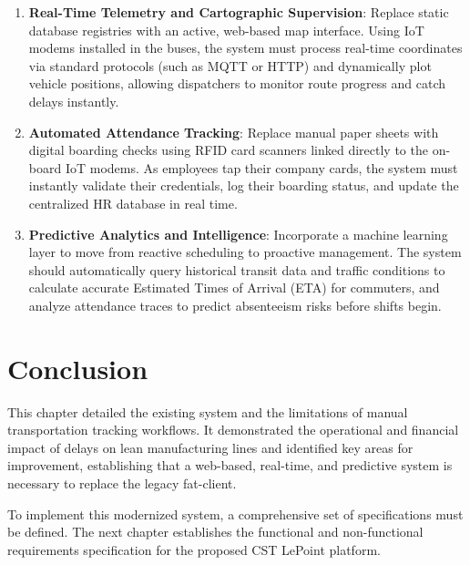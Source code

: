 \begin{enumerate}
  \item \textbf{Real-Time Telemetry and Cartographic Supervision}: Replace static database registries with an active, web-based map interface. Using IoT modems installed in the buses, the system must process real-time coordinates via standard protocols (such as MQTT or HTTP) and dynamically plot vehicle positions, allowing dispatchers to monitor route progress and catch delays instantly.
  \item \textbf{Automated Attendance Tracking}: Replace manual paper sheets with digital boarding checks using RFID card scanners linked directly to the on-board IoT modems. As employees tap their company cards, the system must instantly validate their credentials, log their boarding status, and update the centralized HR database in real time.
  \item \textbf{Predictive Analytics and Intelligence}: Incorporate a machine learning layer to move from reactive scheduling to proactive management. The system should automatically query historical transit data and traffic conditions to calculate accurate Estimated Times of Arrival (ETA) for commuters, and analyze attendance traces to predict absenteeism risks before shifts begin.
\end{enumerate}

\section{Conclusion}

This chapter detailed the existing system and the limitations of manual transportation tracking workflows. It demonstrated the operational and financial impact of delays on lean manufacturing lines and identified key areas for improvement, establishing that a web-based, real-time, and predictive system is necessary to replace the legacy fat-client.

To implement this modernized system, a comprehensive set of specifications must be defined. The next chapter establishes the functional and non-functional requirements specification for the proposed CST LePoint platform.
